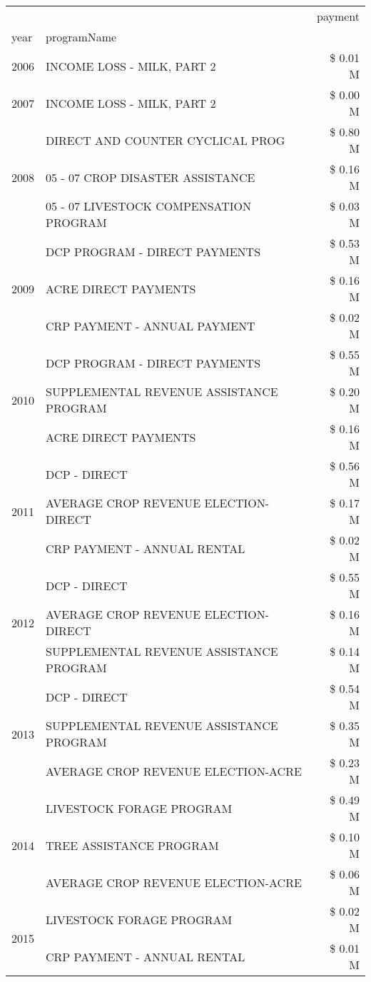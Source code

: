 \begin{tabular}{llr}
\toprule
 &  & payment \\
year & programName &  \\
\midrule
2006 & INCOME LOSS - MILK, PART 2 & \$ 0.01 M \\
\cline{1-3}
2007 & INCOME LOSS - MILK, PART 2 & \$ 0.00 M \\
\cline{1-3}
\multirow[t]{3}{*}{2008} & DIRECT AND COUNTER CYCLICAL PROG & \$ 0.80 M \\
 & 05 - 07 CROP DISASTER ASSISTANCE & \$ 0.16 M \\
 & 05 - 07 LIVESTOCK COMPENSATION PROGRAM & \$ 0.03 M \\
\cline{1-3}
\multirow[t]{3}{*}{2009} & DCP PROGRAM - DIRECT PAYMENTS & \$ 0.53 M \\
 & ACRE DIRECT PAYMENTS & \$ 0.16 M \\
 & CRP PAYMENT - ANNUAL PAYMENT & \$ 0.02 M \\
\cline{1-3}
\multirow[t]{3}{*}{2010} & DCP PROGRAM - DIRECT PAYMENTS & \$ 0.55 M \\
 & SUPPLEMENTAL REVENUE ASSISTANCE PROGRAM & \$ 0.20 M \\
 & ACRE DIRECT PAYMENTS & \$ 0.16 M \\
\cline{1-3}
\multirow[t]{3}{*}{2011} & DCP - DIRECT & \$ 0.56 M \\
 & AVERAGE CROP REVENUE ELECTION-DIRECT & \$ 0.17 M \\
 & CRP PAYMENT - ANNUAL RENTAL & \$ 0.02 M \\
\cline{1-3}
\multirow[t]{3}{*}{2012} & DCP - DIRECT & \$ 0.55 M \\
 & AVERAGE CROP REVENUE ELECTION-DIRECT & \$ 0.16 M \\
 & SUPPLEMENTAL REVENUE ASSISTANCE PROGRAM & \$ 0.14 M \\
\cline{1-3}
\multirow[t]{3}{*}{2013} & DCP - DIRECT & \$ 0.54 M \\
 & SUPPLEMENTAL REVENUE ASSISTANCE PROGRAM & \$ 0.35 M \\
 & AVERAGE CROP REVENUE ELECTION-ACRE & \$ 0.23 M \\
\cline{1-3}
\multirow[t]{3}{*}{2014} & LIVESTOCK FORAGE PROGRAM & \$ 0.49 M \\
 & TREE ASSISTANCE PROGRAM & \$ 0.10 M \\
 & AVERAGE CROP REVENUE ELECTION-ACRE & \$ 0.06 M \\
\cline{1-3}
\multirow[t]{3}{*}{2015} & LIVESTOCK FORAGE PROGRAM & \$ 0.02 M \\
 & CRP PAYMENT - ANNUAL RENTAL & \$ 0.01 M \\

\end{tabular}
